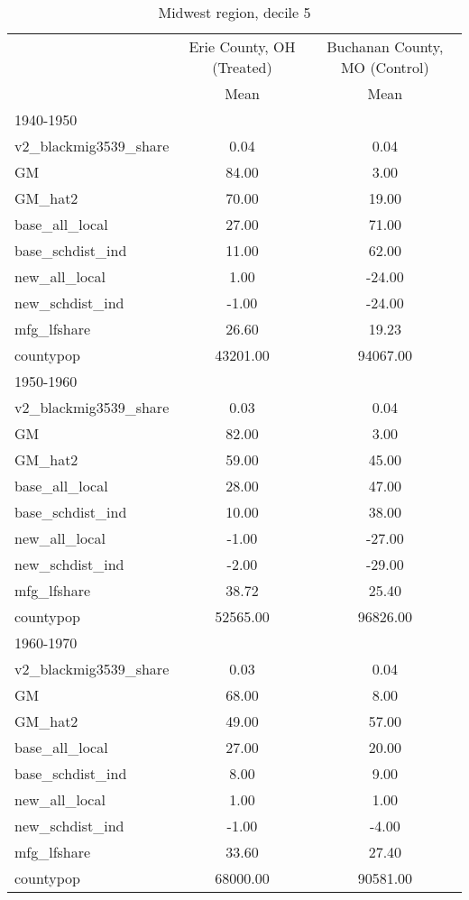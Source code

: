 \begin{table}[htbp]\centering
\def\sym#1{\ifmmode^{#1}\else\(^{#1}\)\fi}
\caption{Midwest region, decile 5 \label{tab1}}
\begin{tabular}{l*{2}{c}}
\toprule
                    &\multicolumn{1}{c}{Erie County, OH (Treated)}&\multicolumn{1}{c}{Buchanan County, MO (Control)}\\
                    &        Mean&        Mean\\
\midrule
1940-1950           &            &            \\
v2\_blackmig3539\_share&        0.04&        0.04\\
GM                  &       84.00&        3.00\\
GM\_hat2             &       70.00&       19.00\\
base\_all\_local      &       27.00&       71.00\\
base\_schdist\_ind    &       11.00&       62.00\\
new\_all\_local       &        1.00&      -24.00\\
new\_schdist\_ind     &       -1.00&      -24.00\\
mfg\_lfshare         &       26.60&       19.23\\
countypop           &    43201.00&    94067.00\\
\midrule
1950-1960           &            &            \\
v2\_blackmig3539\_share&        0.03&        0.04\\
GM                  &       82.00&        3.00\\
GM\_hat2             &       59.00&       45.00\\
base\_all\_local      &       28.00&       47.00\\
base\_schdist\_ind    &       10.00&       38.00\\
new\_all\_local       &       -1.00&      -27.00\\
new\_schdist\_ind     &       -2.00&      -29.00\\
mfg\_lfshare         &       38.72&       25.40\\
countypop           &    52565.00&    96826.00\\
\midrule
1960-1970           &            &            \\
v2\_blackmig3539\_share&        0.03&        0.04\\
GM                  &       68.00&        8.00\\
GM\_hat2             &       49.00&       57.00\\
base\_all\_local      &       27.00&       20.00\\
base\_schdist\_ind    &        8.00&        9.00\\
new\_all\_local       &        1.00&        1.00\\
new\_schdist\_ind     &       -1.00&       -4.00\\
mfg\_lfshare         &       33.60&       27.40\\
countypop           &    68000.00&    90581.00\\
\bottomrule
\end{tabular}
\end{table}
